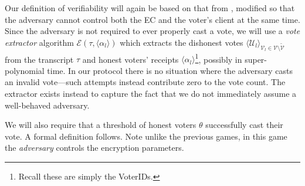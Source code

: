 \documentclass[12pt,a4paper]{article}
\theoremstyle{definition}
\begin{document}
Our definition of verifiability will again be based on that from \cite{kiayias2015end}, modified so that the adversary cannot control both the EC and the voter's client at the same time. Since the adversary is not required to ever properly cast a vote, we will use a \textit{vote extractor} algorithm $\mathcal{E}\left(\tau, \langle \alpha_l \rangle\right)$ which extracts the dishonest votes $\langle \mathcal{U}_l \rangle_{\mathcal{V}_l\in\mathcal{V}\setminus\tilde{\mathcal{V}}}$ from the transcript $\tau$ and honest voters' receipts $\langle \alpha_l \rangle$\footnote{Recall these are simply the VoterIDs.}, possibly in super-polynomial time. In our protocol there is no situation where the adversary casts an invalid vote---such attempts instead contribute zero to the vote count. The extractor exists instead to capture the fact that we do not immediately assume a well-behaved adversary.

We will also require that a threshold of honest voters $\theta$ successfully cast their vote. A formal definition follows. Note unlike the previous games, in this game the \textit{adversary} controls the encryption parameters.
\end{document}
